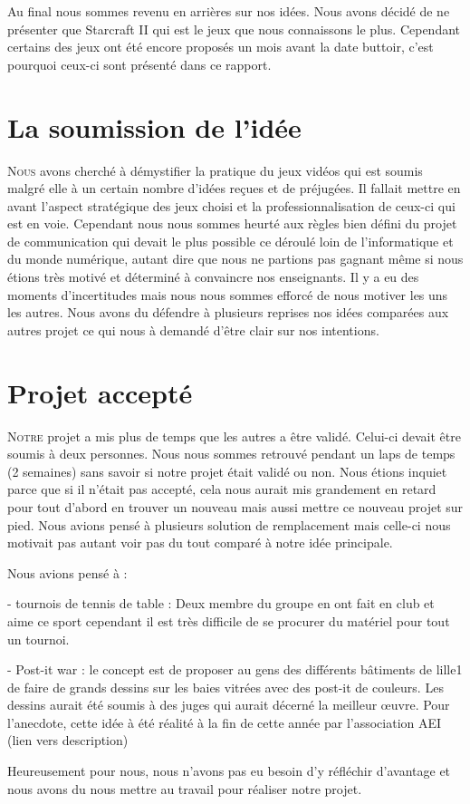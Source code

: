 Au final nous sommes revenu en arrières sur nos idées. Nous avons décidé
de ne présenter que Starcraft II qui est le jeux que nous connaissons le
plus. Cependant certains des jeux ont été encore proposés un mois avant
la date buttoir, c'est pourquoi ceux-ci sont présenté dans ce rapport.

\section{La soumission de l'idée}%
\label{sec:la_soumission_de_leidee}

\lettrine{N}{ous} avons cherché à démystifier la pratique du jeux vidéos
qui est soumis malgré elle à un certain nombre d'idées reçues et de
préjugées.  Il fallait mettre en avant l'aspect stratégique des jeux
choisi et la professionnalisation de ceux-ci qui est en voie. Cependant
nous nous sommes heurté aux règles bien défini du projet de
communication qui devait le plus possible ce déroulé loin de
l'informatique et du monde numérique, autant dire que nous ne partions
pas gagnant même si nous étions très motivé et déterminé à convaincre
nos enseignants. Il y a eu des moments d'incertitudes mais nous nous
sommes efforcé de nous motiver les uns les autres. Nous avons du
défendre à plusieurs reprises nos idées comparées aux autres projet ce
qui nous à demandé d'être clair sur nos intentions.

\section{Projet accepté}%
\label{sec:projet_accepte}

\lettrine{N}{otre} projet a mis plus de temps que les autres a être
validé.  Celui-ci devait être soumis à deux personnes. Nous nous sommes
retrouvé pendant un laps de temps (2 semaines) sans savoir si notre
projet était validé ou non. Nous étions inquiet parce que si il n'était
pas accepté, cela nous aurait mis grandement en retard pour tout d'abord
en trouver un nouveau mais aussi mettre ce nouveau projet sur pied. Nous
avions pensé à plusieurs solution de remplacement mais celle-ci nous
motivait pas autant voir pas du tout comparé à notre idée principale.

Nous avions pensé à :

- tournois de tennis de table : Deux membre du groupe en ont fait en
club et aime ce sport cependant il est très difficile de se procurer du
matériel pour tout un tournoi.

- Post-it war : le concept est de proposer au gens des différents
bâtiments de lille1 de faire de grands dessins sur les baies vitrées
avec des post-it de couleurs. Les dessins aurait été soumis à des juges
qui aurait décerné la meilleur \oe{}uvre.  Pour l'anecdote, cette idée à
été réalité à la fin de cette année par l'association AEI (lien vers
description)

Heureusement pour nous, nous n'avons pas eu besoin d'y réfléchir
d'avantage et nous avons du nous mettre au travail pour réaliser notre
projet.

